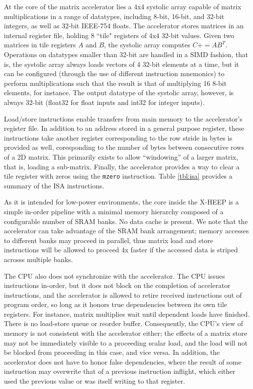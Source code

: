 \documentclass[acmsmall, nonacm=true]{acmart}
\newcommand{\pluseq}{\mathrel{{+}{=}}}
\begin{document}
At the core of the matrix accelerator lies a 4x4 systolic array capable of matrix multiplications in a range of datatypes, including 8-bit, 16-bit, and 32-bit integers, as well as 32-bit IEEE-754 floats. The accelerator stores matrices in an internal register file, holding 8 ``tile" registers of 4x4 32-bit values. Given two matrices in tile registers $A$ and $B$, the systolic array computes $C \pluseq AB^T$. Operations on datatypes smaller than 32-bit are handled in a SIMD fashion, that is, the systolic array always loads vectors of 4 32-bit elements at a time, but it can be configured (through the use of different instruction mnemonics) to perform multiplications such that the result is that of multiplying 16 8-bit elements, for instance. The output datatype of the systolic array, however, is always 32-bit (float32 for float inputs and int32 for integer inputs).

Load/store instructions enable transfers from main memory to the accelerator's register file. In addition to an address stored in a general purpose register, these instructions take another register corresponding to the row stride in bytes is provided as well, coresponding to the number of bytes between consecutive rows of a 2D matrix. This primarily exists to allow ``windowing'' of a larger matrix, that is, loading a sub-matrix. Finally, the accelerator provides a way to clear a tile register with zeros using the \verb|mzero| instruction. Table \ref{tbl:isa} provides a summary of the ISA instructions.

As it is intended for low-power environments, the core inside the X-HEEP is a simple in-order pipeline with a minimal memory hierarchy composed of a configurable number of SRAM banks. No data cache is present. We note that the accelerator can take advantage of the SRAM bank arrangement; memory accesses to different banks may proceed in parallel, thus matrix load and store instructions will be allowed to proceed 4x faster if the accessed data is striped acrosss multiple banks.

The CPU also does not synchronize with the accelerator. The CPU issues instructions in-order, but it does not block on the completion of accelerator instructions, and the accelerator is allowed to retire received instructions out of program order, so long as it honors true dependencies between its own tile registers. For instance, matrix multiplies wait until dependent loads have finished. There is no load-store queue or reorder buffer. Consequently, the CPU's view of memory is not consistent with the accelerator either; the effects of a matrix store may not be immediately visible to a proceeding scalar load, and the load will not be blocked from proceeding in this case, and vice versa. 
In addition, the accelerator does not have to honor false dependencies, where the result of some instruction may overwrite that of a previous instruction inflight, which either used the previous value or was itself writing to that register.
\end{document}
